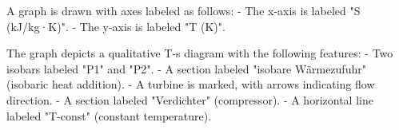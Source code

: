 A graph is drawn with axes labeled as follows:  
- The x-axis is labeled "S (kJ/kg·K)".  
- The y-axis is labeled "T (K)".  

The graph depicts a qualitative T-s diagram with the following features:  
- Two isobars labeled "P1" and "P2".  
- A section labeled "isobare Wärmezufuhr" (isobaric heat addition).  
- A turbine is marked, with arrows indicating flow direction.  
- A section labeled "Verdichter" (compressor).  
- A horizontal line labeled "T-const" (constant temperature).